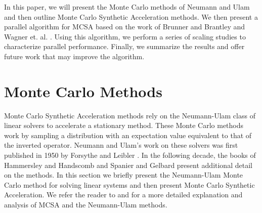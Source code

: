 \documentclass{snamc2013}
\begin{document}
In this paper, we will present the Monte Carlo methods of Neumann and
Ulam and then outline Monte Carlo Synthetic Acceleration methods. We
then present a parallel algorithm for MCSA based on the work of
Brunner and Brantley \cite{brunner_efficient_2009} and Wagner
et. al. \cite{wagner_hybrid_2010}. Using this algorithm, we perform a
series of scaling studies to characterize parallel
performance. Finally, we summarize the results and offer future work
that may improve the algorithm.

\section{Monte Carlo Methods}
Monte Carlo Synthetic Acceleration methods rely on the Neumann-Ulam
class of linear solvers to accelerate a stationary method. These Monte
Carlo methods work by sampling a distribution with an expectation
value equivalent to that of the inverted operator. Neumann and Ulam's
work on these solvers was first published in 1950 by Forsythe and
Leibler \cite{forsythe_matrix_1950}. In the following decade, the
books of Hammersley and Handscomb \cite{hammersley_monte_1964} and
Spanier and Gelbard \cite{spanier_monte_1969} present additional
detail on the methods. In this section we briefly present the
Neumann-Ulam Monte Carlo method for solving linear systems and then
present Monte Carlo Synthetic Acceleration. We refer the reader to
\cite{evans_monte_2009} and \cite{evans_monte_2012} for a more
detailed explanation and analysis of MCSA and the Neumann-Ulam
methods.
\end{document}
